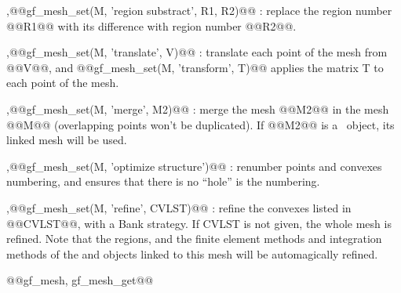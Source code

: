 \begin{cmddescription}
  \sep{@@gf\_mesh\_set(M, 'region substract', R1, R2)@@} : 
  replace the region number @@R1@@ with its difference with region number @@R2@@.


  \sep{@@gf\_mesh\_set(M, 'translate', V)@@} : translate each point of
  the mesh from @@V@@, and @@gf\_mesh\_set(M, 'transform', T)@@ applies
  the matrix T to each point of the mesh.

  \sep{@@gf\_mesh\_set(M, 'merge', M2)@@} :
  merge the mesh @@M2@@ in the mesh @@M@@ (overlapping points won't be
  duplicated). If @@M2@@ is a \tmf\ object, its linked mesh will be
  used.
  
  \sep{@@gf\_mesh\_set(M, 'optimize structure')@@} : renumber points and
  convexes numbering, and ensures that there is no ``hole'' is the
  numbering.

  \sep{@@gf\_mesh\_set(M, 'refine', CVLST)@@} : refine the convexes listed in @@CVLST@@, with a Bank
  strategy. If CVLST is not given, the whole mesh is refined. Note
  that the regions, and the finite element methods and integration
  methods of the \tmf and \tmim objects linked to this mesh will be
  automagically refined.
\end{cmddescription}
\begin{gfseealso}
  @@gf\_mesh, gf\_mesh\_get@@
\end{gfseealso}
\newpage


